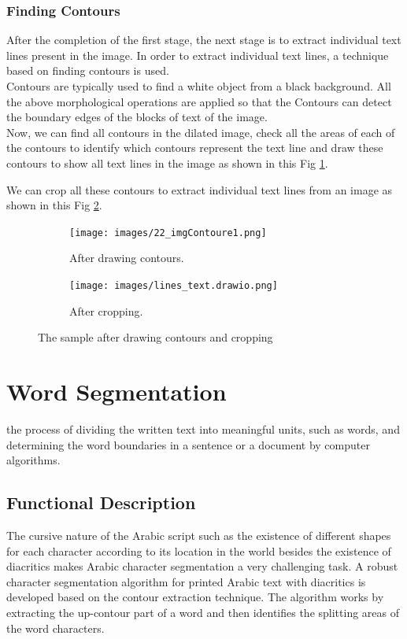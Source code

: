 \subsubsection{Finding Contours}

After the completion of the first stage, the next stage is to extract individual text lines present in the image. In order to extract individual text lines, a technique based on finding contours is used.\\

Contours are typically used to find a white object from a black background. All the above morphological operations are applied so that the Contours can detect the boundary edges of the blocks of text of the image.\\

Now, we can find all contours in the dilated image, check all the areas of each of the contours to identify which contours represent the text line and draw these contours to show all text lines in the image as shown in this Fig \ref{fig:drawing}.

We can crop all these contours to extract individual text lines from an image as shown in this Fig \ref{fig:crop}.

\begin{figure}[!htb]
     \centering
     \begin{subfigure}[b]{0.4\textwidth}
        \centering
        \texttt{[image: images/22\_imgContoure1.png]}
        \caption{After drawing contours.} 
        \label{fig:drawing}
     \end{subfigure}
     \hfill
     \begin{subfigure}[b]{0.4\textwidth}
        \centering
        \texttt{[image: images/lines\_text.drawio.png]}
        \caption{After cropping.} 
        \label{fig:crop}
     \end{subfigure}
    \caption{The sample after drawing contours and cropping}
    \label{fig:drawing-contours-cropping}
\end{figure}


\section{Word Segmentation}
the process of dividing the written text into meaningful units, such as words, and determining the word boundaries in a sentence or a document by computer algorithms.

\subsection{Functional Description}
 The cursive nature of the Arabic script such as the existence of different shapes for each character according to its location in the world besides the existence of diacritics makes Arabic character segmentation a very challenging task. A robust character segmentation algorithm for printed Arabic text with diacritics is developed based on the contour extraction technique. The algorithm works by extracting the up-contour part of a word and then identifies the splitting areas of the word characters. 

